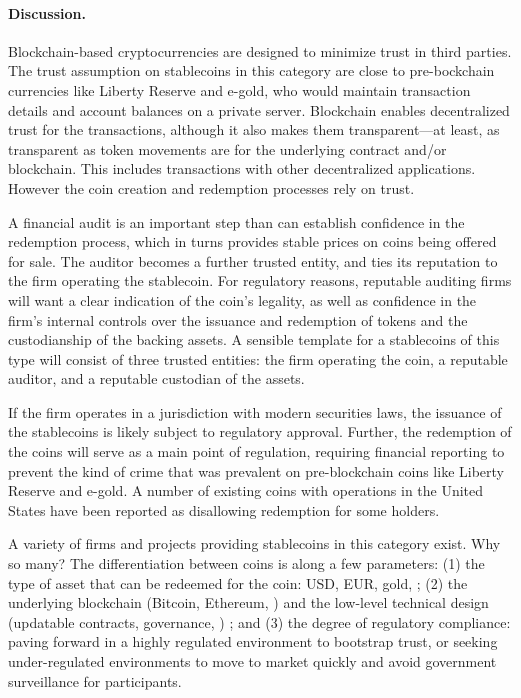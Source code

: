 \paragraph{Discussion.} Blockchain-based cryptocurrencies are designed to minimize trust in third parties. The trust assumption on stablecoins in this category are close to pre-bockchain currencies like Liberty Reserve and e-gold, who would maintain transaction details and account balances on a private server. Blockchain enables decentralized trust for the transactions, although it also makes them transparent---at least, as transparent as token movements are for the underlying contract and/or blockchain. This includes transactions with other decentralized applications. However the coin creation and redemption processes rely on trust.

A financial audit is an important step than can establish confidence in the redemption process, which in turns provides stable prices on coins being offered for sale. The auditor becomes a further trusted entity, and ties its reputation to the firm operating the stablecoin. For regulatory reasons, reputable auditing firms will want a clear indication of the coin's legality, as well as confidence in the firm's internal controls over the issuance and redemption of tokens and the custodianship of the backing assets. A sensible template for a stablecoins of this type will consist of three trusted entities: the firm operating the coin, a reputable auditor, and a reputable custodian of the assets.

If the firm operates in a jurisdiction with modern securities laws, the issuance of the stablecoins is likely subject to regulatory approval. Further, the redemption of the coins will serve as a main point of regulation, requiring financial reporting to prevent the kind of crime that was prevalent on pre-blockchain coins like Liberty Reserve and e-gold. A number of existing coins with operations in the United States have been reported as disallowing redemption for some holders.


A variety of firms and projects providing stablecoins in this category exist. Why so many? The differentiation between coins is along a few parameters: (1) the type of asset that can be redeemed for the coin: USD, EUR, gold, \etc; (2) the underlying blockchain (\eg Bitcoin, Ethereum, \etc) and the low-level technical design (updatable contracts, governance, \etc) ; and (3) the degree of regulatory compliance: paving forward in a highly regulated environment to bootstrap trust, or seeking under-regulated environments to move to market quickly and avoid government surveillance for participants.


